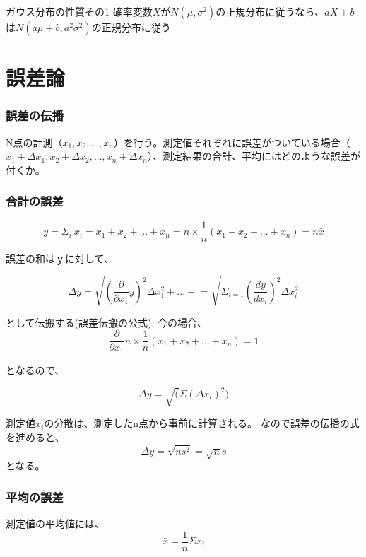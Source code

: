 \begin{itembox}[l]{ガウス分布の性質その1}
  確率変数$X$が$N(\mu,\sigma^2)$の正規分布に従うなら、$aX+b$は$N(a\mu+b,a^2\sigma^2)$の正規分布に従う
\end{itembox}




\section{誤差論}
\subsubsection{誤差の伝播}
N点の計測（$x_1, x_2, ..., x_n$）を行う。測定値それぞれに誤差がついている場合（$x_1\pm\Delta x_1, x_2\pm\Delta x_2, ..., x_n\pm\Delta x_n$）、測定結果の合計、平均にはどのような誤差が付くか。

\subsubsection{合計の誤差}

\begin{equation}
  y=\Sigma_i~x_i=x_1+x_2+...+x_n=n\times\frac{1}{n}(x_1+x_2+...+x_n)=n\bar{x}
\end{equation}

誤差の和はｙに対して、

\begin{equation}
  \Delta y = \sqrt{\left(\frac{\partial}{\partial x_1}y \right)^2 \Delta x_1^2 + ... + } = \sqrt{\Sigma_{i=1}\left(\frac{dy}{dx_i}\right)^2\Delta x_i^2}
\end{equation}

として伝搬する(誤差伝搬の公式).
今の場合、
\begin{equation}
  \frac{\partial}{\partial x_1}n\times \frac{1}{n}(x_1+x_2+...+x_n)=1
\end{equation}

となるので、

\begin{equation}
  \Delta y=\sqrt(\Sigma(\Delta x_i)^2)
\end{equation}

測定値$x_{i}$の分散は、測定したn点から事前に計算される。
なので誤差の伝播の式を進めると、
\begin{equation}
  \Delta y=\sqrt{ns^2}=\sqrt{n}s
\end{equation}
となる。

\subsubsection{平均の誤差}
測定値の平均値には、
\begin{equation}
  \bar{x}=\frac{1}{n}\Sigma x_i
\end{equation}

